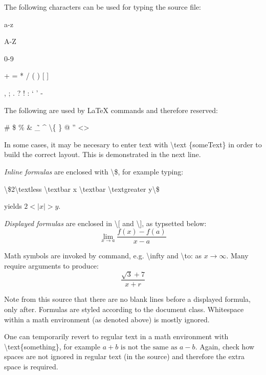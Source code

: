 \documentclass{sample}
\begin{document}
The following characters can be used for typing the source file:
\begin{center}
a-z

A-Z

0-9

+ = * / ( ) [ ]

, ; . ? ! : ` ' -
\end{center}

The following are used by LaTeX commands and therefore reserved:

\begin{center}
\# \$ \% \& \~ \_ \^{} \textbackslash \{ \} @ '' \textbar \textless \textgreater
\end{center}

In some cases, it may be necesary to enter text with \textbackslash text \{someText\} in order to build the correct layout. This is demonstrated in the next line.

\emph{Inline formulas} are enclosed with \textbackslash \$, for example typing:

\begin{center}
\textbackslash \$2\textbackslash textless \textbackslash textbar x \textbackslash textbar \textbackslash textgreater y\textbackslash \$
\end{center}

yields $2 < |x| > y$.

\emph{Displayed formulas} are enclosed in \textbackslash [ and \textbackslash ], as typsetted below:
\[
\lim_{x \to a} \frac{f(x) - f(a)}{x-a}
\]

Math symbols are invoked by command, e.g. \textbackslash infty and \textbackslash to: as $x \to \infty$. Many require arguments to produce:
\[
\frac{\sqrt{3}+7}{x + r}
\]

Note from this source that there are no blank lines before a displayed formula, only after. Formulas are styled according to the document class. Whitespace within a math environment (as denoted above) is mostly ignored. 

One can temporarily revert to regular text in a math environment with \textbackslash text\{something\}, for example $a + b \text{ is not the same as } a - b$. Again, check how spaces are not ignored in regular text (in the source) and therefore the extra space is required.
\end{document}
